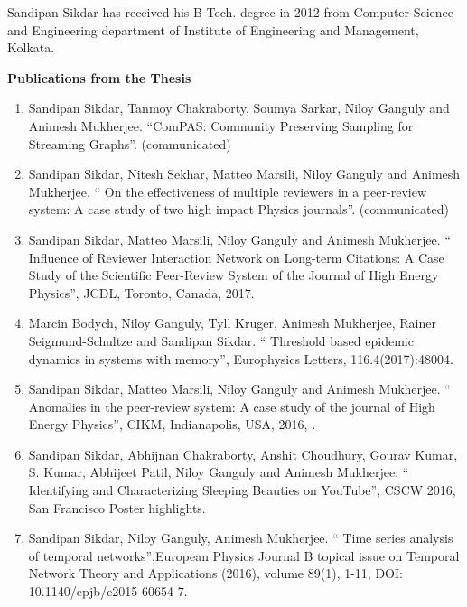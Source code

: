 
\noindent Sandipan Sikdar has received his B-Tech. degree in 2012 from Computer Science and Engineering department of Institute of Engineering and Management, Kolkata.  
  


\singlespace
\begin{center}
\vspace{0.3cm}
{\bfseries {\large Publications from the Thesis
}}
\vspace{0.3cm}
\end{center}

\begin{enumerate}
\item  Sandipan Sikdar, Tanmoy Chakraborty, Soumya Sarkar, Niloy Ganguly and Animesh Mukherjee. ``ComPAS: Community Preserving Sampling for Streaming Graphs''. (communicated)
\item  Sandipan Sikdar, Nitesh Sekhar, Matteo Marsili, Niloy Ganguly and Animesh Mukherjee. `` On the effectiveness of multiple reviewers in a peer-review system: A case study of two high impact Physics journals''. (communicated)
 \item  Sandipan Sikdar, Matteo Marsili, Niloy Ganguly and Animesh Mukherjee. `` Influence of Reviewer Interaction Network on Long-term Citations: A Case Study of the Scientific Peer-Review System of the Journal of High Energy Physics'', JCDL, Toronto, Canada, 2017.
   \item  Marcin Bodych, Niloy Ganguly, Tyll Kruger, Animesh Mukherjee, Rainer Seigmund-Schultze and Sandipan Sikdar. `` Threshold based epidemic dynamics in systems with memory'', Europhysics Letters, 116.4(2017):48004.
   \item  Sandipan Sikdar, Matteo Marsili, Niloy Ganguly and Animesh Mukherjee. `` Anomalies in the peer-review system: A case study of the journal of High Energy Physics'', CIKM, Indianapolis, USA, 2016, .
   \item  Sandipan Sikdar, Abhijnan Chakraborty, Anshit Choudhury, Gourav Kumar, S. Kumar, Abhijeet Patil, Niloy Ganguly and Animesh Mukherjee. `` Identifying and Characterizing Sleeping Beauties on YouTube'', CSCW 2016, San Francisco Poster highlights.
   \item  Sandipan Sikdar, Niloy Ganguly, Animesh Mukherjee. `` Time series analysis of temporal networks'',European Physics Journal B topical issue on  Temporal Network Theory and Applications (2016), volume 89(1), 1-11, DOI: 10.1140/epjb/e2015-60654-7. 

\end{enumerate}
